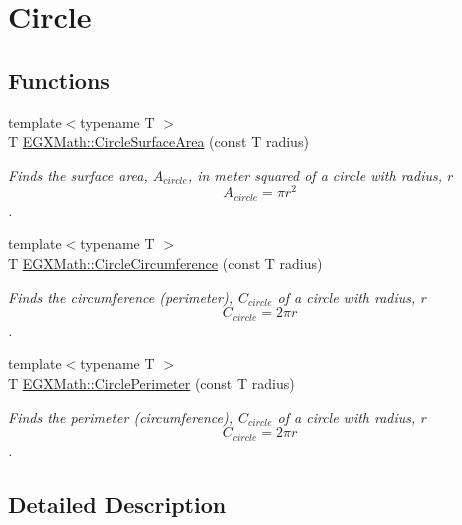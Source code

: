 \hypertarget{group___e_g_x_math-_geometry-2_d-_circle}{}\section{Circle}
\label{group___e_g_x_math-_geometry-2_d-_circle}
\subsection*{Functions}
\begin{DoxyCompactItemize}
\item 
{\footnotesize template$<$typename T $>$ }\\T \mbox{\hyperlink{group___e_g_x_math-_geometry-2_d-_circle_gaa4486100a643c57bd7a80c1c11ae3f60}{E\+G\+X\+Math\+::\+Circle\+Surface\+Area}} (const T radius)
\begin{DoxyCompactList}\small\item\em Finds the surface area, $A_{circle}$, in meter squared of a circle with radius, $r$ \[ A_{circle}=\pi r^2 \]. \end{DoxyCompactList}\item 
{\footnotesize template$<$typename T $>$ }\\T \mbox{\hyperlink{group___e_g_x_math-_geometry-2_d-_circle_gadb55695b75a06a3f3534494eb767e18e}{E\+G\+X\+Math\+::\+Circle\+Circumference}} (const T radius)
\begin{DoxyCompactList}\small\item\em Finds the circumference (perimeter), $C_{circle}$ of a circle with radius, $r$ \[ C_{circle}=2 \pi r \]. \end{DoxyCompactList}\item 
{\footnotesize template$<$typename T $>$ }\\T \mbox{\hyperlink{group___e_g_x_math-_geometry-2_d-_circle_gad32d0bded2e74c52a4c41cfffd2a9e77}{E\+G\+X\+Math\+::\+Circle\+Perimeter}} (const T radius)
\begin{DoxyCompactList}\small\item\em Finds the perimeter (circumference), $C_{circle}$ of a circle with radius, $r$ \[ C_{circle}=2 \pi r \]. \end{DoxyCompactList}\end{DoxyCompactItemize}


\subsection{Detailed Description}


